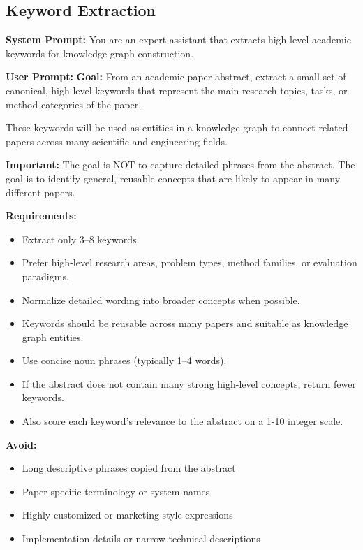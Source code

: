 \subsection{Keyword Extraction}
\label{app:keyword_prompt}
\begin{tcolorbox}[breakable, colback=black!5!white, colframe=black!60!black,
  left=1ex, right=1ex, top=0.5ex, bottom=0.5ex,
  fontupper=\small\ttfamily, fontlower=\small\ttfamily,
  title=\textbf{Keyword Extraction}]
\textbf{System Prompt:}
You are an expert assistant that extracts high-level academic keywords for knowledge graph construction.

\medskip\textbf{User Prompt:}
\textbf{Goal:}
From an academic paper abstract, extract a small set of canonical, high-level keywords that represent the main research topics, tasks, or method categories of the paper.

These keywords will be used as entities in a knowledge graph to connect related papers across many scientific and engineering fields.

\textbf{Important:}
The goal is NOT to capture detailed phrases from the abstract.
The goal is to identify general, reusable concepts that are likely to appear in many different papers.

\textbf{Requirements:}
\begin{itemize}\small
\item Extract only 3--8 keywords.
\item Prefer high-level research areas, problem types, method families, or evaluation paradigms.
\item Normalize detailed wording into broader concepts when possible.
\item Keywords should be reusable across many papers and suitable as knowledge graph entities.
\item Use concise noun phrases (typically 1--4 words).
\item If the abstract does not contain many strong high-level concepts, return fewer keywords.
\item Also score each keyword's relevance to the abstract on a 1-10 integer scale.
\end{itemize}

\textbf{Avoid:}
\begin{itemize}\small
\item Long descriptive phrases copied from the abstract
\item Paper-specific terminology or system names
\item Highly customized or marketing-style expressions
\item Implementation details or narrow technical descriptions
\end{itemize}


\end{tcolorbox}
